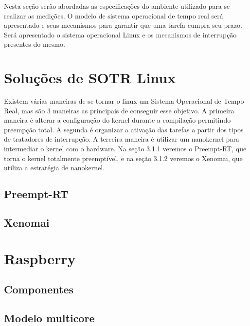 
Nesta seção serão abordadas as especificações do ambiente utilizado para se realizar as medições. O modelo de sistema operacional de tempo real será apresentado e seus mecanismos para garantir que uma tarefa cumpra seu prazo. Será apresentado o sistema operacional Linux e os mecanismos de interrupção presentes do mesmo.

\section{Soluções de SOTR Linux}

Existem várias maneiras de se tornar o linux um Sistema Operacional de Tempo Real, mas são 3 maneiras as principais de conseguir esse objetivo. A primeira maneira é alterar a configuração do kernel durante a compilação permitindo preempção total. A segunda é organizar a ativação das tarefas a partir dos tipos de tratadores de interrupção. A terceira maneira é utilizar um nanokernel para intermediar o kernel com o hardware. Na seção 3.1.1 veremos o Preempt-RT, que torna o kernel totalmente preemptível, e na seção 3.1.2 veremos o Xenomai, que utiliza a estratégia de nanokernel.

\subsection{Preempt-RT}


\subsection{Xenomai}
\section{Raspberry}
\subsection{Componentes}
\subsection{Modelo multicore}
